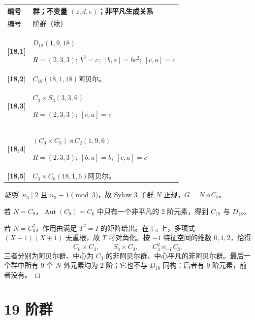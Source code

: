 \documentclass[UTF8,fontset=fandol,11pt,a4paper]{ctexart}
\newcommand{\Aut}{\operatorname{Aut}}\newcommand{\GL}{\operatorname{GL}}\newcommand{\ord}{\operatorname{ord}}\newcommand{\Z}{\mathrm Z}
\begin{document}
\begin{longtable}{@{}p{17mm}>{\raggedright\arraybackslash}p{141mm}@{}}

\toprule 编号 & 群；不变量 $(z,d,e)$；非平凡生成关系\\\midrule\endfirsthead

\toprule 编号 & 18 阶群（续）\\\midrule\endhead\bottomrule\endfoot

\textbf{[18,1]} & $D_{18}$\quad $(1,9,18)$\par\(R=(2,3,3);\allowbreak\ b^{3}=c;\allowbreak\ [b,a]=bc^{2};\allowbreak\ [c,a]=c\)\\[3pt]

\textbf{[18,2]} & $C_{18}$\quad $(18,1,18)$\quad 阿贝尔。\\[3pt]

\textbf{[18,3]} & $C_{3}\times S_{3}$\quad $(3,3,6)$\par\(R=(2,3,3);\allowbreak\ [c,a]=c\)\\[3pt]

\textbf{[18,4]} & $(C_{3}\times C_{3})\rtimes C_{2}$\quad $(1,9,6)$\par\(R=(2,3,3);\allowbreak\ [b,a]=b;\allowbreak\ [c,a]=c\)\\[3pt]

\textbf{[18,5]} & $C_{3}\times C_{6}$\quad $(18,1,6)$\quad 阿贝尔。\\[3pt]

\end{longtable}\endgroup

\begin{proof}[证明]
$n_3\mid2$ 且 $n_3\equiv1\pmod3$，故 Sylow $3$ 子群 $N$ 正规，$G=N\rtimes C_2$。

若 $N=C_9$，$\Aut(C_9)=C_6$ 中只有一个非平凡的 $2$ 阶元素，得到 $C_{18}$ 与 $D_{18}$。

若 $N=C_3^2$，作用由满足 $T^2=I$ 的矩阵给出。在 $\mathbb F_3$ 上，多项式 $(X-1)(X+1)$ 无重根，故 $T$ 可对角化。按 $-1$ 特征空间的维数 $0,1,2$，恰得
\[
C_6\times C_3,\qquad S_3\times C_3,\qquad C_3^2\rtimes_{-I}C_2.
\]
三者分别为阿贝尔群、中心为 $C_3$ 的非阿贝尔群、中心平凡的非阿贝尔群。最后一个群中所有 $9$ 个 $N$ 外元素均为 $2$ 阶；它也不与 $D_{18}$ 同构：后者有 $9$ 阶元素，前者没有。
\end{proof}

\section*{19 阶群}\label{order:19}
\end{document}
